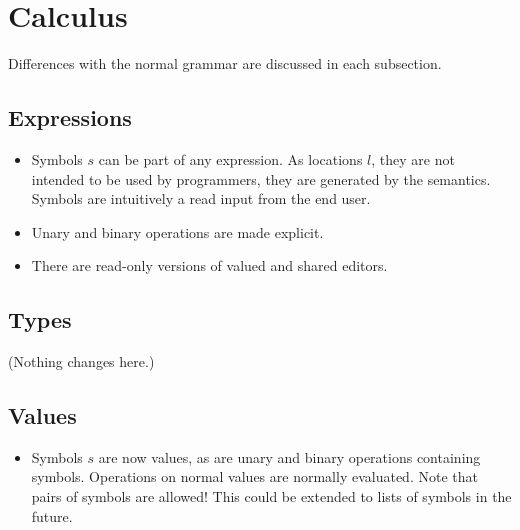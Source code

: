

\pagebreak
\section{Calculus}
\label{sec:language}

Differences with the normal grammar are discussed in each subsection.


\subsection{Expressions}


\begin{itemize}
  \item
    Symbols $s$ can be part of any expression.
    As locations $l$, they are not intended to be used by programmers,
    they are generated by the semantics.
    Symbols are intuitively a read input from the end user.
  \item
    Unary and binary operations are made explicit.
\end{itemize}


\begin{itemize}
  \item
    There are read-only versions of valued and shared editors.
\end{itemize}



\subsection{Types}


(Nothing changes here.)


\subsection{Values}


\begin{itemize}
  \item
    Symbols $s$ are now values,
    as are unary and binary operations containing symbols.
    Operations on normal values are normally evaluated.
    Note that pairs of symbols are allowed!
    This could be extended to lists of symbols in the future.
\end{itemize}

